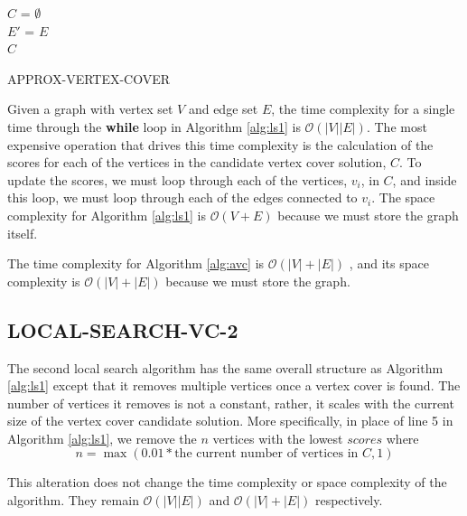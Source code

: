 \documentclass[sigconf]{acmart}
\newcommand{\bigo}[1]{\mathcal{O}(#1)}
\begin{document}
\begin{algorithm}[h]
	\SetAlgoNoLine
	$C$ = $\emptyset$\\
	$E'$ = $E$\\
	\Return $C$
	
	\caption{APPROX-VERTEX-COVER}
	\label{alg:avc}
\end{algorithm}

Given a graph with vertex set $V$ and edge set $E$, the time complexity for a single time through the \textbf{while} loop in Algorithm \ref{alg:ls1} is $\bigo{|V||E|}$. The most expensive operation that drives this time complexity is the calculation of the scores for each of the vertices in the candidate vertex cover solution, $C$. To update the scores, we must loop through each of the vertices, $v_i$, in $C$, and inside this loop, we must loop through each of the edges connected to $v_i$. The space complexity for Algorithm \ref{alg:ls1} is $\bigo{V + E}$ because we must store the graph itself.

The time complexity for Algorithm \ref{alg:avc} is $\bigo{|V| + |E|}$ \cite{intro_alg_2009}, and its space complexity is $\bigo{|V| + |E|}$ because we must store the graph.  

\subsection{LOCAL-SEARCH-VC-2}
The second local search algorithm has the same overall structure as Algorithm \ref{alg:ls1} except that it removes multiple vertices once a vertex cover is found. The number of vertices it removes is not a constant, rather, it scales with the current size of the vertex cover candidate solution. More specifically, in place of line 5 in Algorithm \ref{alg:ls1}, we remove the $n$ vertices with the lowest $scores$ where
\begin{equation}
	n = \max(0.01 * \textrm{the current number of vertices in $C$}, 1)
\end{equation}

This alteration does not change the time complexity or space complexity of the algorithm. They remain $\bigo{|V||E|}$ and $\bigo{|V| + |E|}$ respectively.
\end{document}
